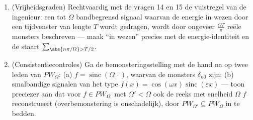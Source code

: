 \begin{problem}[{Weekendopgave --- $\partial_tu =
\partial^2_{xx}u$, van begin tot eind opgelost}]
\begin{enumerate}[resume]
        gewiskundigd.
  \item (Vrijheidsgraden) Rechtvaardig met de vragen 14 en 15 de
        vuistregel van de ingenieur: een tot $\Omega$
        bandbegrensd signaal waarvan de energie in wezen door een
        tijdvenster van lengte $T$ wordt gedragen, wordt door
        ongeveer $\frac{\Omega T}\pi$ reële monsters beschreven
        --- maak ``in wezen'' precies met de energie-identiteit
        en de staart $\sum_{\abs{n\pi/\Omega} > T/2}$.
  \item (Consistentiecontroles) Ga de bemonsteringsstelling met
        de hand na op twee leden van $PW_\Omega$: (a) $f =
        \operatorname{sinc}(\Omega\,\cdot)$, waarvan de monsters
        $\delta_{n0}$ zijn; (b) smalbandige signalen van het type
        $f(x) = \cos(\omega x) \operatorname{sinc}(\varepsilon
        x)$ --- toon preciezer aan dat voor $f \in PW_{\Omega'}$
        met $\Omega' < \Omega$ ook de reeks met snelheid $\Omega$
        $f$ reconstrueert (overbemonstering is onschadelijk),
        door $PW_ {\Omega'} \subseteq PW_\Omega$ in te bedden.
\end{enumerate}


\end{problem}
